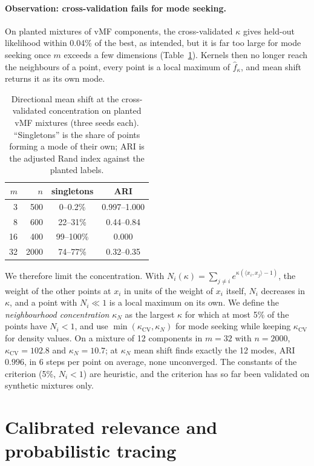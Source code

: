 \documentclass[10pt,twocolumn]{article}
\theoremstyle{definition}
\theoremstyle{remark}
\begin{document}
\paragraph{Observation: cross-validation fails for mode seeking.}
On planted mixtures of vMF components, the cross-validated $\kappa$ gives held-out likelihood within 0.04\% of the best, as intended, but it is far too large for mode seeking once $m$ exceeds a few dimensions (Table~\ref{tab:kappa}).
Kernels then no longer reach the neighbours of a point, every point is a local maximum of $\hat f_\kappa$, and mean shift returns it as its own mode.

\begin{table}[t]\centering\small
\caption{Directional mean shift at the cross-validated concentration on planted vMF mixtures (three seeds each). ``Singletons'' is the share of points forming a mode of their own; ARI is the adjusted Rand index against the planted labels.}\label{tab:kappa}
\begin{tabular}{rrcc}\toprule
$m$ & $n$ & singletons & ARI \\\midrule
3 & 500 & 0--0.2\% & 0.997--1.000 \\
8 & 600 & 22--31\% & 0.44--0.84 \\
16 & 400 & 99--100\% & 0.000 \\
32 & 2000 & 74--77\% & 0.32--0.35 \\\bottomrule
\end{tabular}
\end{table}

We therefore limit the concentration.
With $N_i(\kappa)=\sum_{j\neq i}e^{\kappa(\langle x_i,x_j\rangle-1)}$, the weight of the other points at $x_i$ in units of the weight of $x_i$ itself, $N_i$ decreases in $\kappa$, and a point with $N_i\ll 1$ is a local maximum on its own.
We define the \emph{neighbourhood concentration} $\kappa_N$ as the largest $\kappa$ for which at most 5\% of the points have $N_i<1$, and use $\min(\kappa_{\mathrm{CV}},\kappa_N)$ for mode seeking while keeping $\kappa_{\mathrm{CV}}$ for density values.
On a mixture of 12 components in $m=32$ with $n=2000$, $\kappa_{\mathrm{CV}}=102.8$ and $\kappa_N=10.7$; at $\kappa_N$ mean shift finds exactly the 12 modes, ARI $0.996$, in 6 steps per point on average, none unconverged.
The constants of the criterion (5\%, $N_i<1$) are heuristic, and the criterion has so far been validated on synthetic mixtures only.

\section{Calibrated relevance and probabilistic tracing}\label{sec:prob}
\end{document}
